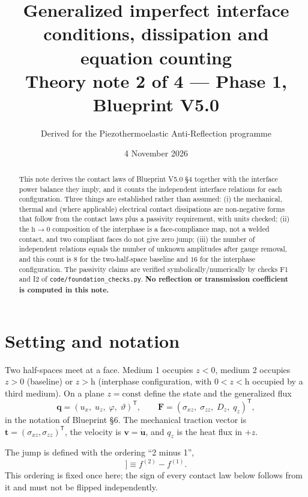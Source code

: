 \documentclass[11pt]{article}
\title{Generalized imperfect interface conditions, dissipation and\\
equation counting\\
\large Theory note 2 of 4 --- Phase 1, Blueprint V5.0}
\author{Derived for the Piezothermoelastic Anti-Reflection programme}
\date{4 November 2026}
\newcommand{\s}{\sigma}
\newcommand{\bth}{\vartheta}
\newcommand{\bu}{\bm{u}}
\newcommand{\bv}{\bm{v}}
\newcommand{\bt}{\bm{t}}
\newcommand{\jmp}[1]{[\![#1]\!]}
\theoremstyle{plain}
\begin{document}
\maketitle

\begin{abstract}
This note derives the contact laws of Blueprint V5.0 \S4 together with the
interface power balance they imply, and it counts the independent interface
relations for each configuration. Three things are established rather than
assumed: (i) the mechanical, thermal and (where applicable) electrical contact
dissipations are non-negative forms that follow from the contact laws plus a
passivity requirement, with units checked; (ii) the $\mathrm{h}\to 0$ composition
of the interphase is a face-compliance map, not a welded contact, and two
compliant faces do not give zero jump; (iii) the number of independent relations
equals the number of unknown amplitudes after gauge removal, and this count is
$8$ for the two-half-space baseline and $16$ for the interphase configuration.
The passivity claims are verified symbolically/numerically by checks F1 and I2 of
\texttt{code/foundation\_checks.py}. \textbf{No reflection or transmission
coefficient is computed in this note.}
\end{abstract}

\section{Setting and notation}
\label{sec:setting}

Two half-spaces meet at a face. Medium 1 occupies $z<0$, medium 2 occupies $z>0$
(baseline) or $z>\mathrm{h}$ (interphase configuration, with $0<z<\mathrm{h}$
occupied by a third medium). On a plane $z=\text{const}$ define the state and the
generalized flux
\begin{equation}
  \bm{q} = (u_x,\;u_z,\;\varphi,\;\bth)^{\mathsf T},
  \qquad
  \bm{F} = (\s_{xz},\;\s_{zz},\;D_z,\;q_z)^{\mathsf T},
  \label{eq:state-flux}
\end{equation}
in the notation of Blueprint \S6. The mechanical traction vector is
$\bt=(\s_{xz},\s_{zz})^{\mathsf T}$, the velocity is $\bv=\dot{\bu}$, and $q_z$
is the heat flux in $+z$.

The jump is defined with the ordering ``2 minus 1'',
\begin{equation}
  \jmp{f} \equiv f^{(2)} - f^{(1)} .
  \label{eq:jump}
\end{equation}
This ordering is fixed once here; the sign of every contact law below follows
from it and must not be flipped independently.
\end{document}
